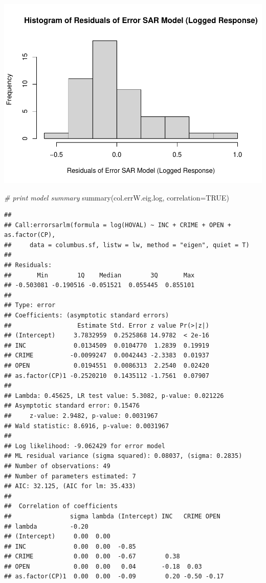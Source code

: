 \documentclass[
]{article}
\newenvironment{Shaded}{\begin{snugshade}}{\end{snugshade}}
\newcommand{\AttributeTok}[1]{\textcolor[rgb]{0.77,0.63,0.00}{#1}}
\newcommand{\CommentTok}[1]{\textcolor[rgb]{0.56,0.35,0.01}{\textit{#1}}}
\newcommand{\ConstantTok}[1]{\textcolor[rgb]{0.00,0.00,0.00}{#1}}
\newcommand{\FunctionTok}[1]{\textcolor[rgb]{0.00,0.00,0.00}{#1}}
\newcommand{\NormalTok}[1]{#1}
\begin{document}
\includegraphics{midterm-project_files/figure-latex/unnamed-chunk-38-1.pdf}

\begin{Shaded}
\begin{Highlighting}[]
\CommentTok{\# print model summary}
\FunctionTok{summary}\NormalTok{(col.errW.eig.log, }\AttributeTok{correlation=}\ConstantTok{TRUE}\NormalTok{)}
\end{Highlighting}
\end{Shaded}

\begin{verbatim}
## 
## Call:errorsarlm(formula = log(HOVAL) ~ INC + CRIME + OPEN + as.factor(CP), 
##     data = columbus.sf, listw = lw, method = "eigen", quiet = T)
## 
## Residuals:
##       Min        1Q    Median        3Q       Max 
## -0.503081 -0.190516 -0.051521  0.055445  0.855101 
## 
## Type: error 
## Coefficients: (asymptotic standard errors) 
##                  Estimate Std. Error z value Pr(>|z|)
## (Intercept)     3.7832959  0.2525868 14.9782  < 2e-16
## INC             0.0134509  0.0104770  1.2839  0.19919
## CRIME          -0.0099247  0.0042443 -2.3383  0.01937
## OPEN            0.0194551  0.0086313  2.2540  0.02420
## as.factor(CP)1 -0.2520210  0.1435112 -1.7561  0.07907
## 
## Lambda: 0.45625, LR test value: 5.3082, p-value: 0.021226
## Asymptotic standard error: 0.15476
##     z-value: 2.9482, p-value: 0.0031967
## Wald statistic: 8.6916, p-value: 0.0031967
## 
## Log likelihood: -9.062429 for error model
## ML residual variance (sigma squared): 0.08037, (sigma: 0.2835)
## Number of observations: 49 
## Number of parameters estimated: 7 
## AIC: 32.125, (AIC for lm: 35.433)
## 
##  Correlation of coefficients 
##                sigma lambda (Intercept) INC   CRIME OPEN 
## lambda         -0.20                                     
## (Intercept)     0.00  0.00                               
## INC             0.00  0.00  -0.85                        
## CRIME           0.00  0.00  -0.67        0.38            
## OPEN            0.00  0.00   0.04       -0.18  0.03      
## as.factor(CP)1  0.00  0.00  -0.09        0.20 -0.50 -0.17
\end{verbatim}
\end{document}
